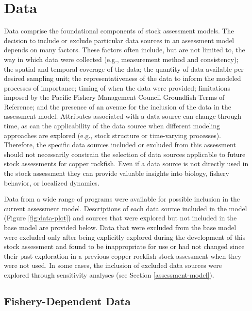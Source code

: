 \documentclass[11pt,
  english,
  letterpaper,
]{article}
\begin{document}
\hypertarget{data}{%
\section{Data}\label{data}}

Data comprise the foundational components of stock assessment models. The decision to include or exclude particular data sources in an assessment model depends on many factors. These factors often include, but are not limited to, the way in which data were collected (e.g., measurement method and consistency); the spatial and temporal coverage of the data; the quantity of data available per desired sampling unit; the representativeness of the data to inform the modeled processes of importance; timing of when the data were provided; limitations imposed by the Pacific Fishery Management Council Groundfish Terms of Reference; and the presence of an avenue for the inclusion of the data in the assessment model. Attributes associated with a data source can change through time, as can the applicability of the data source when different modeling approaches are explored (e.g., stock structure or time-varying processes). Therefore, the specific data sources included or excluded from this assessment should not necessarily constrain the selection of data sources applicable to future stock assessments for copper rockfish. Even if a data source is not directly used in the stock assessment they can provide valuable insights into biology, fishery behavior, or localized dynamics.

Data from a wide range of programs were available for possible inclusion in the current assessment model. Descriptions of each data source included in the model (Figure \ref{fig:data-plot}) and sources that were explored but not included in the base model are provided below. Data that were excluded from the base model were excluded only after being explicitly explored during the development of this stock assessment and found to be inappropriate for use or had not changed since their past exploration in a previous copper rockfish stock assessment when they were not used. In some cases, the inclusion of excluded data sources were explored through sensitivity analyses (see Section \ref{assessment-model}).

\hypertarget{fishery-dependent-data}{%
\subsection{Fishery-Dependent Data}\label{fishery-dependent-data}}
\end{document}
